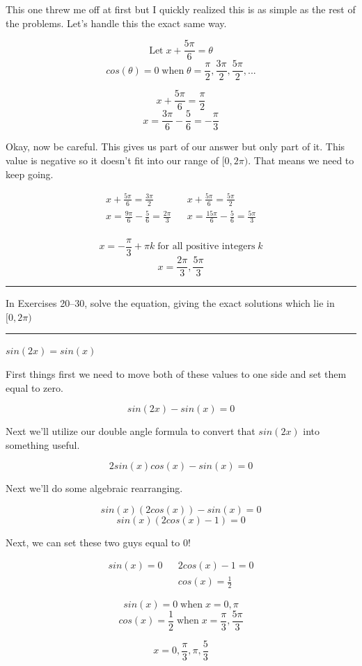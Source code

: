 \documentclass[10pt,letterpaper]{amspset}
\begin{document}
\begin{solution}
   This one threw me off at first but I quickly realized this is as simple as the rest of the problems. Let's handle this the exact same way.
   
   \[\text{Let} \; x + \frac{5\pi}{6} = \theta\]
   \[cos(\theta) = 0 \; \text{when} \; \theta = \frac{\pi}{2}, \frac{3\pi}{2}, \frac{5\pi}{2}, ...\]
   
   \[x + \frac{5\pi}{6} = \frac{\pi}{2}\]
   \[x = \frac{3\pi}{6} - \frac{5}{6} = -\frac{\pi}{3}\]
   
   Okay, now be careful. This gives us part of our answer but only part of it. This value is negative so it doesn't fit into our range of $[0, 2\pi)$. That means we need to keep going.
   
    \begin{align}
        x + \frac{5\pi}{6} = \frac{3\pi}{2} && x + \frac{5\pi}{6} = \frac{5\pi}{2} \\[+1mm]
        x = \frac{9\pi}{6} - \frac{5}{6} = \frac{2\pi}{3} && x = \frac{15\pi}{6} - \frac{5}{6} = \frac{5\pi}{3} \\
    \end{align}
    
    \[\boxed{  x = -\frac{\pi}{3} + \pi k \; \text{for all positive integers} \; k  }\]
    \[\boxed{  x = \frac{2\pi}{3}, \frac{5\pi}{3}  }\]
\end{solution}


\pagebreak


\hrule \medskip 
In Exercises 20--30, solve the equation, giving the exact solutions which lie in $[0, 2\pi)$ \medskip 
\hrule

\begin{problem}[20]
    $sin(2x) = sin(x)$
\end{problem}

\begin{solution}
    First things first we need to move both of these values to one side and set them equal to zero.
    
    \[ sin(2x) - sin(x) = 0\]
    
    Next we'll utilize our double angle formula to convert that $sin(2x)$ into something useful.
    
    \[2sin(x)cos(x) - sin(x) = 0\]
    
    Next we'll do some algebraic rearranging.
    
    \[sin(x)(2cos(x)) - sin(x) = 0\]
    \[sin(x)(2cos(x)-1) = 0\]
    
    Next, we can set these two guys equal to 0! 
    
    \begin{align}
        sin(x) = 0 && 2cos(x) - 1 = 0 \\
        && cos(x) = \frac{1}{2}
    \end{align}
    
    \[sin(x) = 0 \; \text{when} \; x = 0, \pi\]
    \[cos(x) = \frac{1}{2} \; \text{when} \; x = \frac{\pi}{3}, \frac{5\pi}{3}\]
    
    \[\boxed{x = 0, \frac{\pi}{3}, \pi, \frac{5}{3}}\]
\end{solution}
\end{document}
